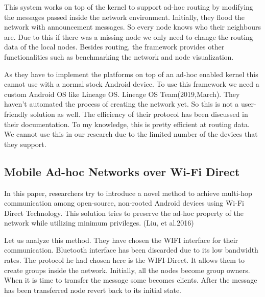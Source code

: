 \vspace{12pt}


This system works on top of the kernel to support ad-hoc routing by modifying the messages passed inside the network environment. Initially, they flood the network with announcement messages. So every node knows who their neighbours are. Due to this if there was a missing node we only need to change the routing data of the local nodes. Besides routing, the framework provides other functionalities such as benchmarking the network and node visualization.

\vspace{12pt}

As they have to implement the platforms on top of an ad-hoc enabled kernel this cannot use with a normal stock Android device. To use this framework we need a custom  Android OS like Lineage OS. Lineage OS Team(2019,March)\cite{lineageOS}. They haven't automated the process of creating the network yet. So this is not a user-friendly solution as well. The efficiency of their protocol has been discussed in their documentation. To my knowledge, this is pretty efficient at routing data. We cannot use this in our research due to the limited number of the devices that they support. 




\vspace{12pt}



\subsection{Mobile Ad-hoc Networks over Wi-Fi Direct}


\vspace{12pt}
In this paper, researchers try to introduce a novel method to achieve multi-hop communication among open-source, non-rooted Android devices using Wi-Fi Direct Technology. This solution tries to preserve the ad-hoc property of the network while utilizing minimum privileges. (Liu, et al.2016)\cite{GO}

\vspace{12pt}


Let us analyze this method. They have chosen the  WIFI  interface for their communication. Bluetooth interface has been discarded due to its low bandwidth rates. The protocol he had chosen here is the WIFI-Direct. It allows them to create groups inside the network. Initially, all the nodes become group owners. When it is time to transfer the message some becomes clients. After the message has been transferred node revert back to its initial state.


